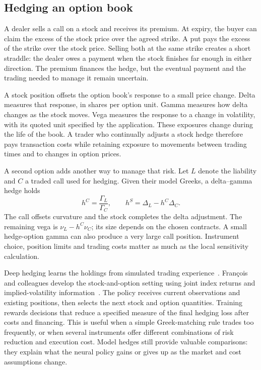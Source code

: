 \documentclass[8pt]{strategynet-journal}
\begin{document}
\begin{SNcolumns}
\section{Hedging an option book}
A dealer sells a call on a stock and receives its premium. At expiry, the
buyer can claim the excess of the stock price over the agreed strike. A put
pays the excess of the strike over the stock price. Selling both at the same
strike creates a short straddle: the dealer owes a payment when the stock
finishes far enough in either direction. The premium finances the hedge,
but the eventual payment and the trading needed to manage it remain uncertain.

A stock position offsets the option book's response to a small price change.
Delta measures that response, in shares per option unit. Gamma measures how
delta changes as the stock moves. Vega measures the response to a change in
volatility, with its quoted unit specified by the application. These exposures
change during the life of the book. A trader who continually adjusts a stock
hedge therefore pays transaction costs while retaining exposure to movements
between trading times and to changes in option prices.

A second option adds another way to manage that risk. Let $L$ denote the
liability and $C$ a traded call used for hedging. Given their model Greeks,
a delta--gamma hedge holds
\begin{equation}
 h^C=\frac{\Gamma_L}{\Gamma_C},\qquad
 h^S=\Delta_L-h^C\Delta_C.
\end{equation}
The call offsets curvature and the stock completes the delta adjustment.
The remaining vega is $\nu_L-h^C\nu_C$; its size depends on the chosen
contracts. A small hedge-option gamma can also produce a very large call
position. Instrument choice, position limits and trading costs matter as much
as the local sensitivity calculation.

Deep hedging learns the holdings from simulated trading experience~\cite{deep}.
Fran\c{c}ois and colleagues develop the stock-and-option setting using joint
index returns and implied-volatility information~\cite{options,reference}.
The policy receives current observations and existing positions, then selects
the next stock and option quantities. Training rewards decisions that reduce
a specified measure of the final hedging loss after costs and financing.
This is useful when a simple Greek-matching rule trades too frequently, or
when several instruments offer different combinations of risk reduction and
execution cost. Model hedges still provide valuable comparisons: they explain
what the neural policy gains or gives up as the market and cost assumptions change.


\end{SNcolumns}
\end{document}

